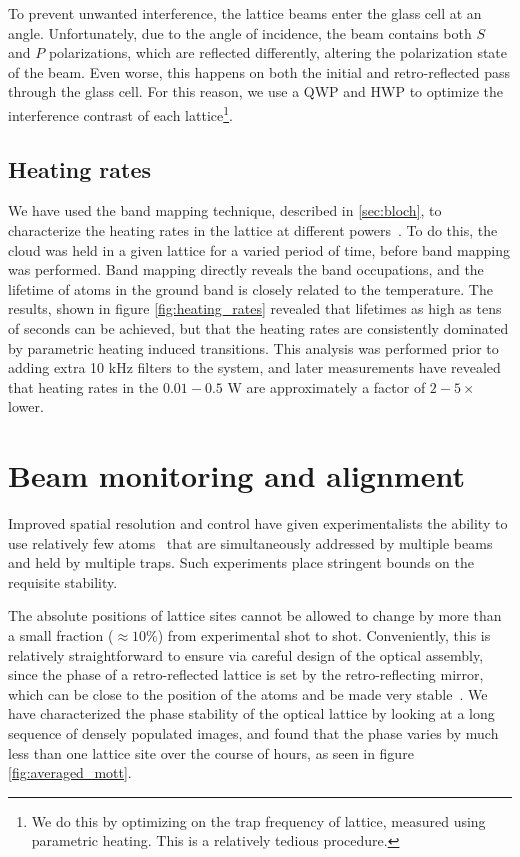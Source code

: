 \documentclass[twocolumn,aps,pra,showpacs,preprintnumbers,bibnotes]{revtex4-1}
\begin{document}
To prevent unwanted interference, the lattice beams enter the glass cell at an angle. 
Unfortunately, due to the angle of incidence, the beam contains both $S$ and $P$ polarizations, which are reflected differently, altering the polarization state of the beam.
Even worse, this happens on both the initial and retro-reflected pass through the glass cell.
For this reason, we use a QWP and HWP to optimize the interference contrast of each lattice\footnote{We do this by optimizing on the trap frequency of lattice, measured using parametric heating. This is a relatively tedious procedure.}.

\subsection{Heating rates}
We have used the band mapping technique, described in \ref{sec:bloch}, to characterize the heating rates in the lattice at different powers~\cite{Blatt2015}.
To do this, the cloud was held in a given lattice for a varied period of time, before band mapping was performed.
Band mapping directly reveals the band occupations, and the lifetime of atoms in the ground band is closely related to the temperature.
The results, shown in figure \ref{fig:heating_rates} revealed that lifetimes as high as tens of seconds can be achieved, but that the heating rates are consistently dominated by parametric heating induced transitions.
This analysis was performed prior to adding extra 10 kHz filters to the system, and later measurements have revealed that heating rates in the $0.01-0.5$ W are approximately a factor of $2-5\times$ lower.


\section{Beam monitoring and alignment}
Improved spatial resolution and control have given experimentalists the ability to use relatively few atoms~\cite{Preiss2015, Choi2016, Mazurenko2016} that are simultaneously addressed by multiple beams and held by multiple traps.
Such experiments place stringent bounds on the requisite stability. 

The absolute positions of lattice sites cannot be allowed to change by more than a small fraction ($\approx 10\%$) from experimental shot to shot.
Conveniently, this is relatively straightforward to ensure via careful design of the optical assembly, since the phase of a retro-reflected lattice is set by the retro-reflecting mirror, which can be close to the position of the atoms and be made very stable~\cite{Huber2014}. 
We have characterized the phase stability of the optical lattice by looking at a long sequence of densely populated images, and found that the phase varies by much less than one lattice site over the course of hours, as seen in figure \ref{fig:averaged_mott}.
\end{document}
